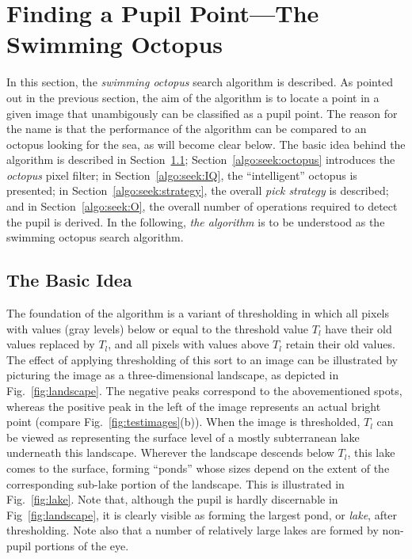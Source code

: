 
\section{Finding a Pupil Point---The Swimming Octopus}
\label{algo:seek}

In this section, the {\em swimming octopus\/} search algorithm is
described.  As pointed out in the previous section, the aim of the
algorithm is to locate a point in a given image that unambigously can
be classified as a pupil point.  The reason for the name is that the
performance of the algorithm can be compared to an octopus looking for
the sea, as will become clear below.  The basic idea behind the
algorithm is described in Section~\ref{algo:seek:idea};
Section~\ref{algo:seek:octopus} introduces the {\em octopus\/} pixel
filter; in Section~\ref{algo:seek:IQ}, the ``intelligent'' octopus is
presented; in Section~\ref{algo:seek:strategy}, the overall {\em pick
  strategy\/} is described; and in Section~\ref{algo:seek:O}, the
overall number of operations required to detect the pupil is derived.
In the following, {\em the algorithm\/} is to be understood as the
swimming octopus search algorithm.

\subsection{The Basic Idea}
\label{algo:seek:idea}


The foundation of the algorithm is a variant of thresholding in which
all pixels with values (gray levels) below or equal to the threshold
value $T_{l}$ have their old values replaced by $T_{l}$, and all
pixels with values above $T_{l}$ retain their old values.  The effect
of applying thresholding of this sort to an image can be illustrated
by picturing the image as a three-dimensional landscape, as depicted
in Fig.~\ref{fig:landscape}.  The negative peaks correspond to the
abovementioned spots, whereas the positive peak in the left of the
image represents an actual bright point (compare
Fig.~\ref{fig:testimages}(b)).  When the image is thresholded, $T_{l}$
can be viewed as representing the surface level of a mostly
subterranean lake underneath this landscape.  Wherever the landscape
descends below $T_{l}$, this lake comes to the surface, forming
``ponds'' whose sizes depend on the extent of the corresponding
sub-lake portion of the landscape.  This is illustrated in
Fig.~\ref{fig:lake}.  Note that, although the pupil is hardly
discernable in Fig~\ref{fig:landscape}, it is clearly visible as
forming the largest pond, or {\em lake\/}, after thresholding.  Note
also that a number of relatively large lakes are formed by non-pupil
portions of the eye.


